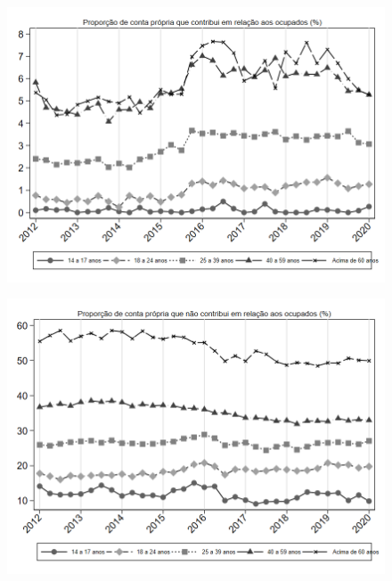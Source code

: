 \begin{frame}[label=_composicao_demografica_faixa_etaria_prop_cpropriaC]{}
\textit{\hyperlink{_composicao_demografica_faixa_etaria}{}}
\begin{figure}
  \centering
  \includegraphics[width=1.0\linewidth]{../../analysis/output/composicao_demografica/faixa_etaria/_composicao_demografica_faixa_etaria_prop_cpropriaC.png}
  \caption{}
  \label{fig:_composicao_demografica_faixa_etaria_prop_cpropriaC}
\end{figure}
\end{frame}

\begin{frame}[label=_composicao_demografica_faixa_etaria_prop_cpropriaNc]{}
\textit{\hyperlink{_composicao_demografica_faixa_etaria}{}}
\begin{figure}
  \centering
  \includegraphics[width=1.0\linewidth]{../../analysis/output/composicao_demografica/faixa_etaria/_composicao_demografica_faixa_etaria_prop_cpropriaNc.png}
  \caption{}
  \label{fig:_composicao_demografica_faixa_etaria_prop_cpropriaNc}
\end{figure}
\end{frame}